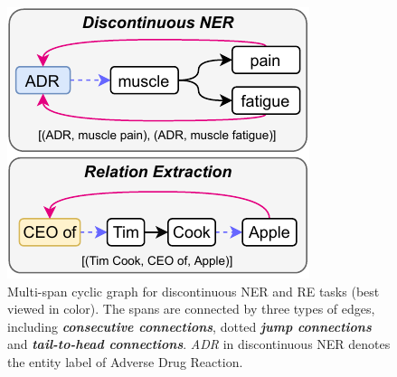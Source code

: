 \begin{figure}[t]
    \centering
    \includegraphics[width=\columnwidth]{figs/Multi-span Cyclic Graph.pdf}
    \caption{
        Multi-span cyclic graph for discontinuous NER and RE tasks (best viewed in color).
        The spans are connected by three types of edges, including \textbf{\textit{consecutive connections}}, dotted \textbf{\color[HTML]{695efb} \textit{jump connections}} and \textbf{\color[HTML]{E9087F} \textit{tail-to-head connections}}.
        \textit{ADR} in discontinuous NER denotes the entity label of Adverse Drug Reaction.
    }
    \label{fig:multi-span-cyclic-graph}
\end{figure}

